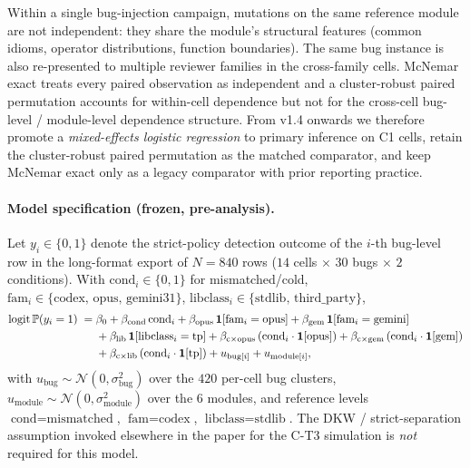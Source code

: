 Within a single bug-injection campaign, mutations on the same reference module are not independent: they share the module's structural features (common idioms, operator distributions, function boundaries). The same bug instance is also re-presented to multiple reviewer families in the cross-family cells. McNemar exact treats every paired observation as independent and a cluster-robust paired permutation accounts for within-cell dependence but not for the cross-cell bug-level / module-level dependence structure. From v1.4 onwards we therefore promote a \emph{mixed-effects logistic regression} to primary inference on C1 cells, retain the cluster-robust paired permutation as the matched comparator, and keep McNemar exact only as a legacy comparator with prior reporting practice.

\paragraph{Model specification (frozen, pre-analysis).}
Let $y_{i} \in \{0,1\}$ denote the strict-policy detection outcome of the $i$-th bug-level row in the long-format export of $N = 840$ rows ($14$ cells $\times$ $30$ bugs $\times$ $2$ conditions). With $\mathrm{cond}_i \in \{0,1\}$ for mismatched/cold, $\mathrm{fam}_i \in \{\text{codex, opus, gemini31}\}$, $\mathrm{libclass}_i \in \{\text{stdlib, third\_party}\}$,
\begin{align}
  \mathrm{logit}\, \mathbb{P}(y_i = 1)
    \;=\;& \beta_0
       + \beta_{\text{cond}}\,\mathrm{cond}_i
       + \beta_{\text{opus}}\,\mathbf{1}[\text{fam}_i = \text{opus}]
       + \beta_{\text{gem}}\,\mathbf{1}[\text{fam}_i = \text{gemini}] \nonumber\\
   &  + \beta_{\text{lib}}\,\mathbf{1}[\text{libclass}_i = \text{tp}]
       + \beta_{\text{c$\times$opus}}\,(\mathrm{cond}_i \cdot \mathbf{1}[\text{opus}])
       + \beta_{\text{c$\times$gem}}\,(\mathrm{cond}_i \cdot \mathbf{1}[\text{gem}]) \nonumber\\
   &  + \beta_{\text{c$\times$lib}}\,(\mathrm{cond}_i \cdot \mathbf{1}[\text{tp}])
       + u_{\text{bug}[i]} + u_{\text{module}[i]},
  \label{eq:me-spec}
\end{align}
with $u_{\text{bug}} \sim \mathcal{N}(0, \sigma_{\text{bug}}^2)$ over the $420$ per-cell bug clusters, $u_{\text{module}} \sim \mathcal{N}(0, \sigma_{\text{module}}^2)$ over the $6$ modules, and reference levels $\text{cond} = \text{mismatched}$, $\text{fam} = \text{codex}$, $\text{libclass} = \text{stdlib}$. The DKW / strict-separation assumption invoked elsewhere in the paper for the C-T3 simulation is \emph{not} required for this model.

